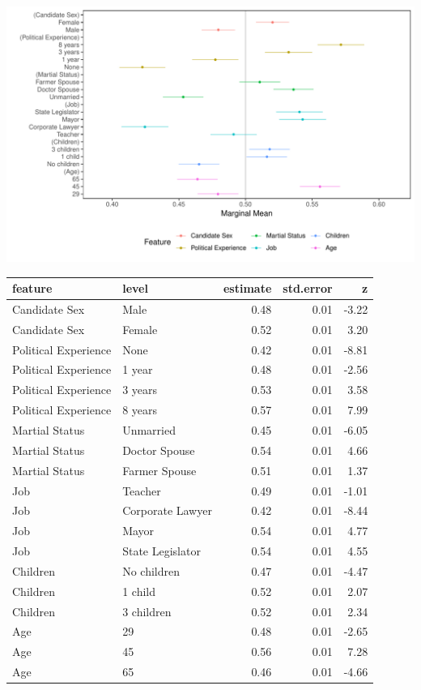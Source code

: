 \documentclass[a4paper,12pt]{article}\usepackage[]{graphicx}\usepackage[]{color}
\makeatletter
\def\maxwidth{ %
  \ifdim\Gin@nat@width>\linewidth
    \linewidth
  \else
    \Gin@nat@width
  \fi
}
\newenvironment{knitrout}{}{} %
\makeatother
\begin{document}
\begin{knitrout}
\color{fgcolor}
\includegraphics[width=\maxwidth]{figure/tkr_mm_appendix-1} 

\end{knitrout}

\clearpage

\begin{table}[ht]
\centering
\begin{tabular}{lp{1.5in}rrr}
  \hline
feature & level & estimate & std.error & z \\ 
  \hline
Candidate Sex & Male & 0.48 & 0.01 & -3.22 \\ 
  Candidate Sex & Female & 0.52 & 0.01 & 3.20 \\ 
  Political Experience & None & 0.42 & 0.01 & -8.81 \\ 
  Political Experience & 1 year & 0.48 & 0.01 & -2.56 \\ 
  Political Experience & 3 years & 0.53 & 0.01 & 3.58 \\ 
  Political Experience & 8 years & 0.57 & 0.01 & 7.99 \\ 
  Martial Status & Unmarried & 0.45 & 0.01 & -6.05 \\ 
  Martial Status & Doctor Spouse & 0.54 & 0.01 & 4.66 \\ 
  Martial Status & Farmer Spouse & 0.51 & 0.01 & 1.37 \\ 
  Job & Teacher & 0.49 & 0.01 & -1.01 \\ 
  Job & Corporate Lawyer & 0.42 & 0.01 & -8.44 \\ 
  Job & Mayor & 0.54 & 0.01 & 4.77 \\ 
  Job & State Legislator & 0.54 & 0.01 & 4.55 \\ 
  Children & No children & 0.47 & 0.01 & -4.47 \\ 
  Children & 1 child & 0.52 & 0.01 & 2.07 \\ 
  Children & 3 children & 0.52 & 0.01 & 2.34 \\ 
  Age & 29 & 0.48 & 0.01 & -2.65 \\ 
  Age & 45 & 0.56 & 0.01 & 7.28 \\ 
  Age & 65 & 0.46 & 0.01 & -4.66 \\ 
   \hline
\end{tabular}
\end{table}
\end{document}
